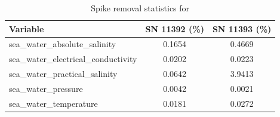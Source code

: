 \begin{table}[h]
\centering
\caption{Spike removal statistics for \projectname{} \casenumber{}}
\label{tab:ntas16_spike_stats}
\begin{tabular}{|l|c|c|}
\hline
Variable & SN 11392 (\%) & SN 11393 (\%) \\
\hline
sea\_water\_absolute\_salinity & 0.1654 & 0.4669 \\
sea\_water\_electrical\_conductivity & 0.0202 & 0.0223 \\
sea\_water\_practical\_salinity & 0.0642 & 3.9413 \\
sea\_water\_pressure & 0.0042 & 0.0021 \\
sea\_water\_temperature & 0.0181 & 0.0272 \\
\hline
\end{tabular}
\end{table}
